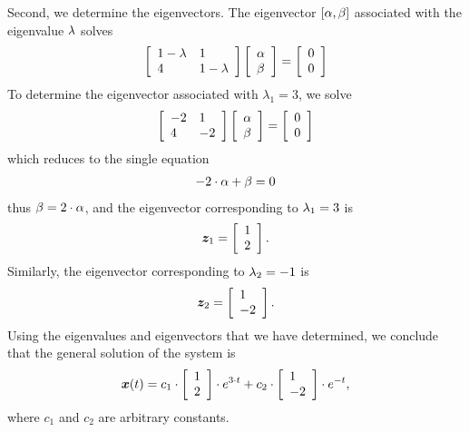 \documentclass[letterpaper,12pt,leqno]{article}
\begin{document}
\begin{enumerate}
Second, we determine the eigenvectors. The eigenvector $[\alpha,\beta]$ associated with the eigenvalue $\lambda$ solves
\begin{align*}
\left[ 
\begin{array}{ll}
1-\lambda & 1 \\ 
4 & 1-\lambda 
\end{array}
 \right] \left[ 
\begin{array}{l}
\alpha \\ 
\beta 
\end{array} \right] =\left[ 
\begin{array}{l}
0\\ 
0
\end{array} \right]
\end{align*}
To determine the eigenvector associated with $\lambda_{1}=3$, we solve 
\begin{align*}
\left[ \begin{array}{ll}
-2& 1\\ 
4 & -2
\end{array}
 \right] \left[ 
\begin{array}{l}
\alpha \\ 
\beta
\end{array} \right] =\left[ 
\begin{array}{l}
0\\ 
0
\end{array} \right]
\end{align*}
which reduces to the single equation
\begin{align*}
-2\cdot \alpha +\beta =0
\end{align*}
thus $\beta =2\cdot \alpha $, and the eigenvector corresponding to $\lambda_{1}=3$ is 
\begin{align*}
\bm{z}_{1}=\left[ 
\begin{array}{l}
1 \\ 
2
\end{array} \right] .
\end{align*}
Similarly, the eigenvector corresponding to $\lambda_{2}=-1$ is 
\begin{align*}
\bm{z}_{2}=\left[ 
\begin{array}{l}
1 \\ 
-2
\end{array} \right].
\end{align*}
Using the eigenvalues and eigenvectors that we have determined, we conclude that the general solution of the system is 
\begin{align*}
\bm{x}(t)=c_{1}\cdot \left[ 
\begin{array}{l}
1 \\ 
2
\end{array} \right] \cdot e^{3\cdot t}+c_{2}\cdot \left[ 
\begin{array}{l}
1 \\ 
-2
\end{array} \right]\cdot e^{-t},
\end{align*}
where $c_{1}$ and $c_{2}$ are arbitrary constants. 


\end{enumerate}
\end{document}
